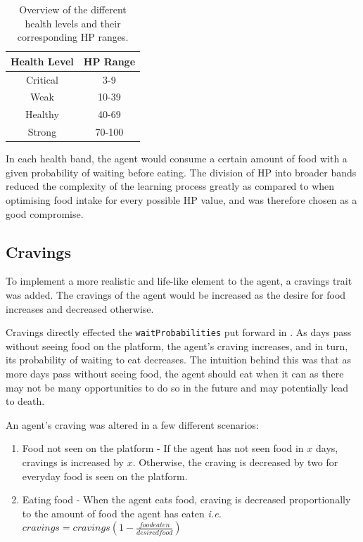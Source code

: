 \begin{table}[htb]
    \centering
    \begin{tabular}{| c | c |}
    \hline
    Health Level & HP Range \\
    \hline
    \hline
     Critical & 3-9 \\ 
    \hline
     Weak &  10-39\\  
     \hline
     Healthy &  40-69\\
     \hline
     Strong & 70-100 \\
     \hline
    \end{tabular}
    \caption{Overview of the different health levels and their corresponding HP ranges.}
    \label{tab:healthLevels}
\end{table}

In each health band, the agent would consume a certain amount of food with a given probability of waiting before eating. The division of HP into broader bands reduced the complexity of the learning process greatly as compared to when optimising food intake for every possible HP value, and was therefore chosen as a good compromise.

\subsection{Cravings}

To implement a more realistic and life-like element to the agent, a cravings trait was added. The cravings of the agent would be increased as the desire for food increases and decreased otherwise.

Cravings directly effected the \texttt{waitProbabilities} put forward in . As days pass without seeing food on the platform, the agent's craving increases, and in turn, its probability of waiting to eat decreases. The intuition behind this was that as more days pass without seeing food, the agent should eat when it can as there may not be many opportunities to do so in the future and may potentially lead to death.\newline

An agent's craving was altered in a few different scenarios:
\begin{enumerate}
    \item Food not seen on the platform - If the agent has not seen food in $x$ days, cravings is increased by $x$. Otherwise, the craving is decreased by two for everyday food is seen on the platform. 
    \item Eating food - When the agent eats food, craving is decreased proportionally to the amount of food the agent has eaten \emph{i.e.} $cravings = cravings \left(1 - \frac{foodeaten}{desiredfood}\right)$
\end{enumerate}

